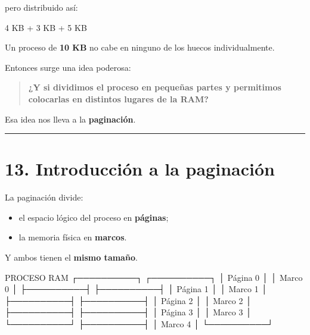 \documentclass[
  spanish,
  letterpaper,
]{scrbook}
\newenvironment{Shaded}{\begin{snugshade}}{\end{snugshade}}
\newcommand{\NormalTok}[1]{\textcolor[rgb]{0.00,0.23,0.31}{#1}}
\providecommand{\tightlist}{%
  \setlength{\itemsep}{0pt}\setlength{\parskip}{0pt}}
\begin{document}
pero distribuido así:

\begin{Shaded}
\begin{Highlighting}[]
\NormalTok{4 KB + 3 KB + 5 KB}
\end{Highlighting}
\end{Shaded}

Un proceso de \textbf{10 KB} no cabe en ninguno de los huecos
individualmente.

Entonces surge una idea poderosa:

\begin{quote}
\textbf{¿Y si dividimos el proceso en pequeñas partes y permitimos
colocarlas en distintos lugares de la RAM?}
\end{quote}

Esa idea nos lleva a la \textbf{paginación}.

\begin{center}\rule{0.5\linewidth}{0.5pt}\end{center}


\chapter{13. Introducción a la
paginación}\label{introducciuxf3n-a-la-paginaciuxf3n}

La paginación divide:

\begin{itemize}
\tightlist
\item
  el espacio lógico del proceso en \textbf{páginas};
\item
  la memoria física en \textbf{marcos}.
\end{itemize}

Y ambos tienen el \textbf{mismo tamaño}.

\begin{Shaded}
\begin{Highlighting}[]
\NormalTok{PROCESO                     RAM}
\NormalTok{┌──────────┐               ┌──────────┐}
\NormalTok{│ Página 0 │               │ Marco 0  │}
\NormalTok{├──────────┤               ├──────────┤}
\NormalTok{│ Página 1 │               │ Marco 1  │}
\NormalTok{├──────────┤               ├──────────┤}
\NormalTok{│ Página 2 │               │ Marco 2  │}
\NormalTok{├──────────┤               ├──────────┤}
\NormalTok{│ Página 3 │               │ Marco 3  │}
\NormalTok{└──────────┘               ├──────────┤}
\NormalTok{                           │ Marco 4  │}
\NormalTok{                           └──────────┘}
\end{Highlighting}
\end{Shaded}
\end{document}

